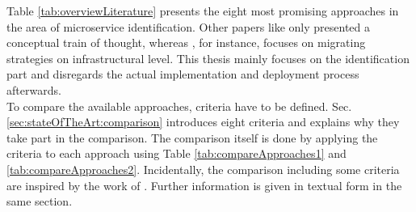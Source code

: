 \noindent
Table \ref{tab:overviewLiterature} presents the eight most promising approaches in the area of microservice identification. Other papers like \cite{TowardsCloudGuiseppe} only presented a conceptual train of thought, whereas \cite{MigratingCloud}, for instance, focuses on migrating strategies on infrastructural level. This thesis mainly focuses on the identification part and disregards the actual implementation and deployment process afterwards. \\
To compare the available approaches, criteria have to be defined. Sec.\ref{sec:stateOfTheArt:comparison} introduces eight criteria and explains why they take part in the comparison. The comparison itself is done by applying the criteria to each approach using Table \ref{tab:compareApproaches1} and \ref{tab:compareApproaches2}. Incidentally, the comparison including some criteria are inspired by the work of \cite{ClassificationOfRefactoring}.
Further information is given in textual form in the same section. 





